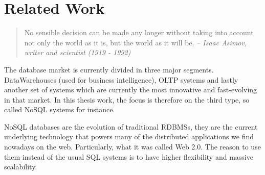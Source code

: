 %
%

 

\chapter{Related Work}

\label{ch:relatedwork}

\begin{quotation}
No sensible decision can be made any longer without taking into account not only the world as it is, but the world as it will be.
{\small\it -- Isaac Asimov, writer and scientist (1919 - 1992)}
\end{quotation}

The database market is currently divided in three major segments. DataWarehouses (used for business intelligence), OLTP systems and lastly another set of systems which are currently the most innovative and fast-evolving in that market. In this thesis work, the focus is therefore on the third type, so called NoSQL systems for instance.

NoSQL databases are the evolution of traditional RDBMSs, they are the current underlying technology that powers many of the distributed applications we find nowadays on the web. Particularly, what it was called Web 2.0. The reason to use them instead of the usual SQL systems is to have higher flexibility and massive scalability.


